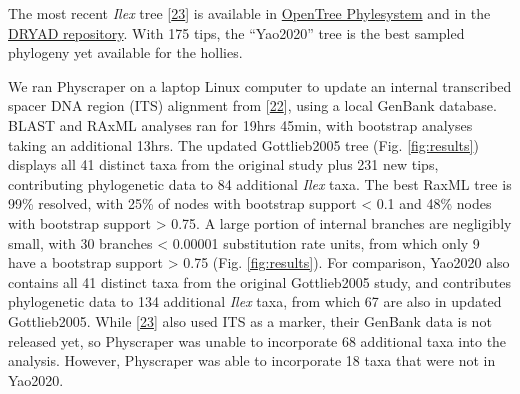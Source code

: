 \documentclass[]{article}
\begin{document}
The most recent \emph{Ilex} tree {[}\protect\hyperlink{ref-yao2020phylogeny}{23}{]} is available in \href{https://tree.opentreeoflife.org/curator/study/view/ot_1984}{OpenTree Phylesystem} and in the \href{https://datadryad.org/stash/dataset/doi:10.5061/dryad.k0p2ngf4x}{DRYAD repository}. With 175 tips, the ``Yao2020'' tree is the best sampled phylogeny yet available for the hollies.

We ran Physcraper on a laptop Linux computer to update an internal transcribed spacer DNA region (ITS) alignment from {[}\protect\hyperlink{ref-gottlieb2005molecular}{22}{]}, using a local GenBank database. BLAST and RAxML analyses ran for 19hrs 45min, with bootstrap analyses taking an additional 13hrs.
The updated Gottlieb2005 tree (Fig. \ref{fig:results}) displays all 41 distinct taxa from the original study plus 231 new tips, contributing phylogenetic data to 84 additional \emph{Ilex} taxa. The best RaxML tree is 99\% resolved, with 25\% of nodes with bootstrap support \textless{} 0.1 and 48\% nodes with bootstrap support \textgreater{} 0.75.
A large portion of internal branches are negligibly small, with 30 branches \textless{} 0.00001 substitution rate units, from which only 9 have a bootstrap support \textgreater{} 0.75 (Fig. \ref{fig:results}).
For comparison, Yao2020 also contains all 41 distinct taxa from the original Gottlieb2005 study,
and contributes phylogenetic data to 134 additional \emph{Ilex} taxa, from which
67 are also in updated Gottlieb2005. While {[}\protect\hyperlink{ref-yao2020phylogeny}{23}{]} also used ITS as a marker, their GenBank data is not released yet, so Physcraper was unable to incorporate 68 additional taxa into the analysis. However, Physcraper was able to incorporate 18 taxa that were not in Yao2020.
\end{document}
